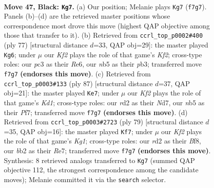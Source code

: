\documentclass[11pt]{article}
\begin{document}
\clearpage

\begin{figure}[p]\centering
\begin{subfigure}{0.46\textwidth}\centering
\resizebox{\linewidth}{!}{%
\newchessgame
\chessboard[
  setfen={8/1p2pk2/n5pp/pN5r/P1p5/2P2PK1/1B1R4/8 b - - 0 47},
  showmover=false,
  pgfstyle=straightmove, color=movearrow, markmove={f7-g7}
]}
\caption{}
\end{subfigure}\hfill
\begin{subfigure}{0.46\textwidth}\centering
\resizebox{\linewidth}{!}{%
\newchessgame
\chessboard[
  setfen={8/5k1p/4rp2/N5p1/1p6/1P1r2P1/2R2B1P/5K2 b - - 0 39},
  showmover=false,
  pgfstyle=straightmove, color=movearrow, markmove={f7-g6}
]}
\caption{}
\end{subfigure}
\\[4pt]
\begin{subfigure}{0.46\textwidth}\centering
\resizebox{\linewidth}{!}{%
\newchessgame
\chessboard[
  setfen={3k4/3n1p2/2RN4/p3p2p/4P1pP/r5P1/5P2/6K1 b - - 7 44},
  showmover=false,
  pgfstyle=straightmove, color=movearrow, markmove={d8-e7}
]}
\caption{}
\end{subfigure}\hfill
\begin{subfigure}{0.46\textwidth}\centering
\resizebox{\linewidth}{!}{%
\newchessgame
\chessboard[
  setfen={5bk1/p3r2p/2R2pp1/8/1pN5/6P1/PP3P1P/5K2 b - - 3 40},
  showmover=false,
  pgfstyle=straightmove, color=movearrow, markmove={g8-f7}
]}
\caption{}
\end{subfigure}
\caption{\textbf{Move 47, Black: \texttt{Kg7}.} (a) Our position; Melanie plays \texttt{Kg7} (\texttt{f7g7}). Panels (b)--(d) are the retrieved master positions whose correspondence most drove this move (highest QAP objective among those that transfer to it). (b) Retrieved from \texttt{ccrl\_top\_p0002\#400} (ply 77) [structural distance $d$=33, QAP obj=29]: the master played \texttt{Kg6}; under $\mu$ our \emph{Kf2} plays the role of that game's \emph{Kf2}; cross-type roles: our \emph{p}c3 as their \emph{R}e6, our \emph{n}b5 as their \emph{p}b3; transferred move \texttt{f7g7} \textbf{(endorses this move)}. (c) Retrieved from \texttt{ccrl\_top\_p0003\#133} (ply 87) [structural distance $d$=37, QAP obj=21]: the master played \texttt{Ke7}; under $\mu$ our \emph{Kf2} plays the role of that game's \emph{Kd1}; cross-type roles: our \emph{r}d2 as their \emph{N}d7, our \emph{n}b5 as their \emph{P}f7; transferred move \texttt{f7g7} \textbf{(endorses this move)}. (d) Retrieved from \texttt{ccrl\_top\_p0003\#2723} (ply 79) [structural distance $d$=35, QAP obj=16]: the master played \texttt{Kf7}; under $\mu$ our \emph{Kf2} plays the role of that game's \emph{Kg1}; cross-type roles: our \emph{r}d2 as their \emph{B}f8, our \emph{b}b2 as their \emph{R}e7; transferred move \texttt{f7g7} \textbf{(endorses this move)}. Synthesis: 8 retrieved analogs transferred to \texttt{Kg7} (summed QAP objective 112, the strongest correspondence among the candidate moves); Melanie committed it via the \texttt{search} selector.}
\label{fig:thought-m93}
\end{figure}
\end{document}
